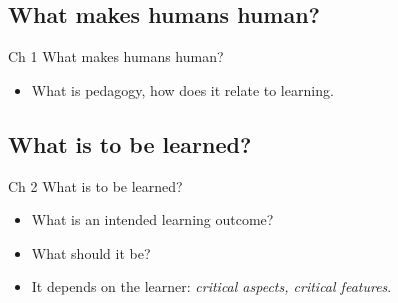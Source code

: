 \subsection{What makes humans human?}

\begin{frame}
  \begin{block}{Ch 1 What makes humans human?}
    \begin{itemize}
      \item What is pedagogy, how does it relate to learning.
    \end{itemize}
  \end{block}
\end{frame}

\subsection{What is to be learned?}

\begin{frame}
  \begin{block}{Ch 2 What is to be learned?}
    \begin{itemize}
      \item What is an intended learning outcome?
      \item What should it be?
      \item It depends on the learner: \emph{critical aspects, critical 
        features}.
    \end{itemize}
  \end{block}
\end{frame}

